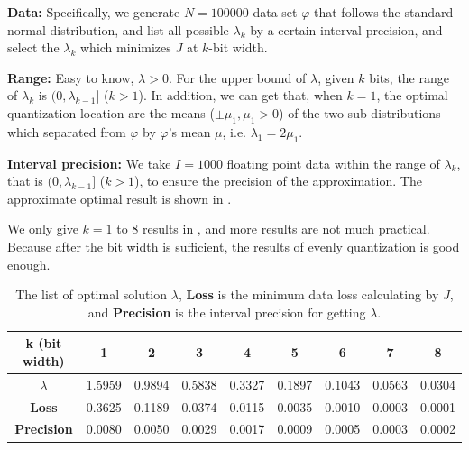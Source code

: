 \textbf{Data:} Specifically, we generate $N=100000$ data set $\varphi$ that follows the standard normal distribution, and list all possible $\lambda_k$ by a certain interval precision, and select the $\lambda_k$ which minimizes $J$ at $k$-bit width.

\textbf{Range:} Easy to know, $\lambda>0$.
For the upper bound of $\lambda$, given $k$ bits, the range of $\lambda_k$ is $(0, \lambda_{k-1}]$ ($k>1$).
In addition, we can get that, when $k=1$, the optimal quantization location are the means ($\pm\mu_1,\mu_1>0$) of the two sub-distributions which separated from $\varphi$ by $\varphi$'s mean $\mu$, i.e. $\lambda_1=2\mu_1$.

\textbf{Interval precision:} We take $I=1000$ floating point data within the range of $\lambda_k$, that is $(0, \lambda_{k-1}]$ ($k>1$), to ensure the precision of the approximation. The approximate optimal result is shown in .

We only give $k = 1$ to $8$ results in , and more results are not much practical. Because after the bit width is sufficient, the results of evenly quantization is good enough.

\renewcommand{\arraystretch}{1.3}
\begin{table}[htbp]
\center
    \caption{The list of optimal solution $\lambda$, \textbf{Loss} is the minimum data loss calculating by $J$, and \textbf{Precision} is the interval precision for getting $\lambda$.}
    \label{tab:optimal_lambda}
\begin{tabular}{c|c|c|c|c|c|c|c|c}
\hline
k (bit width)                      & 1      & 2      & 3      & 4      & 5      & 6      & 7      & 8      \\ \hline
$\lambda$ & 1.5959 & 0.9894 & 0.5838 & 0.3327 & 0.1897 & 0.1043 & 0.0563 & 0.0304 \\ \hline
\textbf{Loss}                   & 0.3625 & 0.1189 & 0.0374 & 0.0115 & 0.0035 & 0.0010 & 0.0003 & 0.0001 \\ \hline
\textbf{Precision} & 0.0080 & 0.0050 & 0.0029 & 0.0017 & 0.0009 & 0.0005 & 0.0003 & 0.0002 \\ \hline
\end{tabular}
\end{table}
%
